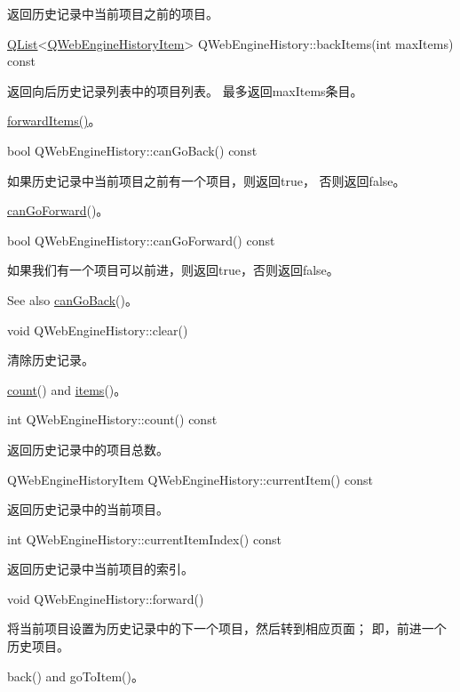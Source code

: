 返回历史记录中当前项目之前的项目。

\href{https://github.com/QtDocumentCN/QtDocumentCN/blob/master/Src/L/QList/QList.md}{QList}<\href{https://github.com/QtDocumentCN/QtDocumentCN/blob/master/Src/W/QWebEngineHistoryItem/QWebEngineHistoryItem.md}{QWebEngineHistoryItem}> QWebEngineHistory::backItems(int maxItems) const

返回向后历史记录列表中的项目列表。 最多返回maxItems条目。

\begin{notice}[另请参阅]
\href{https://doc.qt.io/qt-5/qwebenginehistory.html#forwardItems}{forwardItems()}。
\end{notice}

bool QWebEngineHistory::canGoBack() const

如果历史记录中当前项目之前有一个项目，则返回true， 否则返回false。

\begin{notice}[另请参阅]
\href{https://doc.qt.io/qt-5/qwebenginehistory.html#canGoForward}{canGoForward}()。
\end{notice}


bool QWebEngineHistory::canGoForward() const

如果我们有一个项目可以前进，则返回true，否则返回false。

See also \href{https://doc.qt.io/qt-5/qwebenginehistory.html#canGoBack}{canGoBack}()。

void QWebEngineHistory::clear()

清除历史记录。

\begin{notice}[另请参阅]
\href{https://doc.qt.io/qt-5/qwebenginehistory.html#count}{count}() and \href{https://doc.qt.io/qt-5/qwebenginehistory.html#items}{items}()。
\end{notice}


int QWebEngineHistory::count() const

返回历史记录中的项目总数。

QWebEngineHistoryItem QWebEngineHistory::currentItem() const

返回历史记录中的当前项目。

int QWebEngineHistory::currentItemIndex() const

返回历史记录中当前项目的索引。

void QWebEngineHistory::forward()

将当前项目设置为历史记录中的下一个项目，然后转到相应页面； 即，前进一个历史项目。

\begin{notice}[另请参阅]
back() and goToItem()。
\end{notice}


